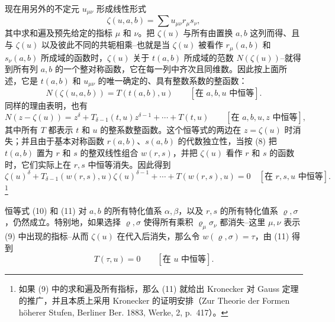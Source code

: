 现在用另外的不定元 $u_{\mu\nu}$ 形成线性形式
\begin{equation}
 \zeta(u,a,b)=\sum u_{\mu\nu}r_\mu s_\nu,
\tag{9}
\end{equation}
其中求和遍及预先给定的指标 $\mu$ 和 $\nu$。把 $\zeta(u)$ 与所有由置换 $a,b$ 这列而得、且与 $\zeta(u)$ 以及彼此不同的共轭相乘--也就是当 $\zeta(u)$ 被看作 $r_\mu(a,b)$ 和 $s_\nu(a,b)$ 所成域的函数时，$\zeta(u)$ 关于 $t(a,b)$ 所成域的范数 $N(\zeta(u))$--就得到所有列 $a,b$ 的一个整对称函数，它在每一列中齐次且同维数。因此按上面所述，它是 $t(a,b)$ 和 $u_{\mu\nu}$ 的唯一确定的、具有整数系数的整函数：
\begin{equation}
 N(\zeta(u,a,b))=T(t(a,b),u)\qquad[\text{在 }a,b,u\text{ 中恒等}].
\tag{10}
\end{equation}
同样的理由表明，也有
\[
N(z-\zeta(u))=z^\delta+T_{\delta-1}(t,u)z^{\delta-1}+\cdots+T(t,u)
\qquad[\text{在 }a,b,u,z\text{ 中恒等}],
\]
其中所有 $T$ 都表示 $t$ 和 $u$ 的整系数整函数。这个恒等式的两边在 $z=\zeta(u)$ 时消失；并且由于基本对称函数 $r(a,b)$、$s(a,b)$ 的代数独立性，当按 (8) 把 $t(a,b)$ 置为 $r$ 和 $s$ 的整双线性组合 $w(r,s)$，并把 $\zeta(u)$ 看作 $r$ 和 $s$ 的函数时，它们实际上在 $r,s$ 中恒等消失。因此得到
\begin{equation}
\zeta(u)^\delta+T_{\delta-1}(w(r,s),u)\zeta(u)^{\delta-1}+\cdots+T(w(r,s),u)=0
\quad[\text{在 }r,s,u\text{ 中恒等}].
\tag{11}
\end{equation}\footnote{如果 (9) 中的求和遍及所有指标，那么 (11) 就给出 Kronecker 对 Gauss 定理的推广，并且本质上采用 Kronecker 的证明安排（Zur Theorie der Formen h\"oherer Stufen, Berliner Ber. 1883, Werke, 2, p.~417）。}

恒等式 (10) 和 (11) 对 $a,b$ 的所有特化值系 $\alpha,\beta$，以及 $r,s$ 的所有特化值系 $\varrho,\sigma$，仍然成立。特别地，如果选择 $\varrho,\sigma$ 使得所有乘积 $\varrho_\mu\sigma_\nu$ 都消失--这里 $\mu,\nu$ 表示 (9) 中出现的指标--从而 $\zeta(u)$ 在代入后消失，那么令 $w(\varrho,\sigma)=\tau$，由 (11) 得到
\begin{equation}
 T(\tau,u)=0\qquad[\text{在 }u\text{ 中恒等}].
\tag{12}
\end{equation}

